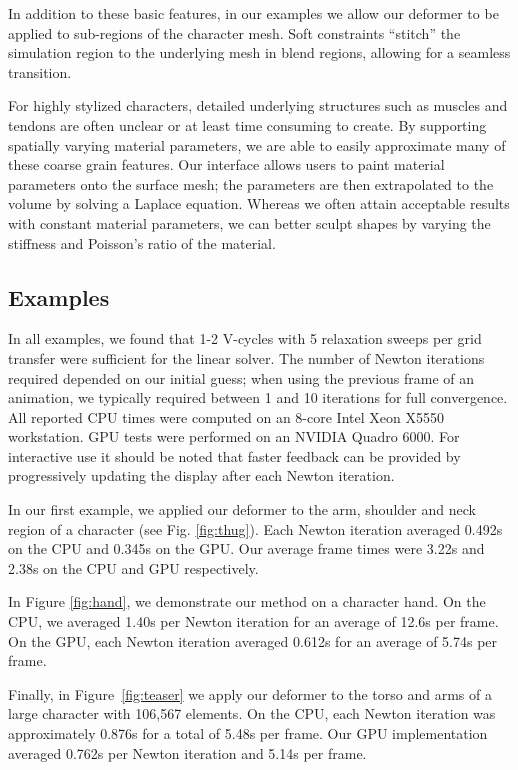 In addition to these basic features, in our examples we allow our deformer to be applied to sub-regions of the character mesh. Soft constraints ``stitch'' the simulation region to the underlying mesh in blend regions, allowing for a seamless transition.  

For highly stylized characters, detailed underlying structures such as muscles and tendons are often unclear or at least time consuming to create. By supporting spatially varying material parameters, we are able to easily approximate many of these coarse grain features.  Our interface allows users to paint material parameters onto the surface mesh; the parameters are then extrapolated to the volume by solving a Laplace equation.  Whereas we often attain acceptable results with constant material parameters, we can better sculpt shapes by varying the stiffness and Poisson's ratio of the material.

\subsection{Examples}
In all examples, we found that 1-2 V-cycles with 5 relaxation sweeps per grid transfer were sufficient for the linear solver.  The number of Newton iterations required depended on our initial guess; when using the previous frame of an animation, we typically required between 1 and 10 iterations for full convergence.  All reported CPU times were computed on an 8-core Intel Xeon X5550 workstation.  GPU tests were performed on an NVIDIA Quadro 6000. For interactive use it should be noted that faster feedback can be provided by progressively updating the display after each Newton iteration.

In our first example, we applied our deformer to the arm, shoulder and neck region of a character (see Fig. \ref{fig:thug}). Each Newton iteration averaged 0.492s on the CPU and 0.345s on the GPU.  Our average frame times were 3.22s and 2.38s on the CPU and GPU respectively.

In Figure \ref{fig:hand}, we demonstrate our method on a character hand.  On the CPU, we averaged 1.40s per Newton iteration for an average of 12.6s per frame.  On the GPU, each Newton iteration averaged  0.612s for an average of 5.74s per frame.

Finally, in Figure~\ref{fig:teaser} we apply our deformer to the torso and arms of a large character with 106,567 elements. On the CPU, each Newton iteration was approximately 0.876s for a total of 5.48s per frame.  Our GPU implementation averaged 0.762s per Newton iteration and 5.14s per frame.
